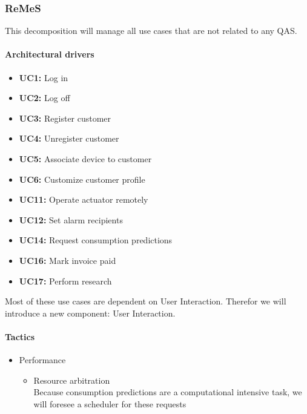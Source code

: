 \subsubsection{ReMeS}
This decomposition will manage all use cases that are not related to any QAS.
\paragraph{Architectural drivers}
\begin{itemize}
	\item \textbf{UC1: } Log in
	\item \textbf{UC2: } Log off
	\item \textbf{UC3: } Register customer
	\item \textbf{UC4: } Unregister customer
	\item \textbf{UC5: } Associate device to customer
	\item \textbf{UC6: } Customize customer profile
	\item \textbf{UC11: } Operate actuator remotely
	\item \textbf{UC12: } Set alarm recipients
	\item \textbf{UC14: } Request consumption predictions
	\item \textbf{UC16: } Mark invoice paid
	\item \textbf{UC17: } Perform research
\end{itemize}
Most of these use cases are dependent on User Interaction. Therefor we will
	introduce a new component: User Interaction.

\paragraph{Tactics}
\begin{itemize}
	\item Performance
	\begin{itemize}
		\item Resource arbitration \\
		Because consumption predictions are a computational intensive task, we
			will foresee a scheduler for these requests
	\end{itemize}
\end{itemize}



